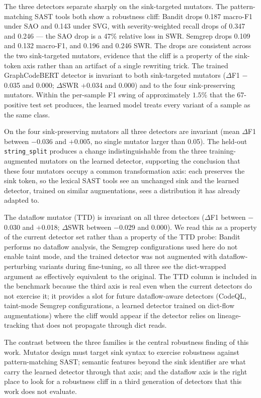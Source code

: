The three detectors separate sharply on the sink-targeted mutators.
The pattern-matching SAST tools both show a robustness cliff: Bandit
drops 0.187 macro-F1 under SAO and 0.143 under SVG, with
severity-weighted recall drops of 0.347 and 0.246 — the SAO drop is
a 47\% relative loss in SWR. Semgrep drops 0.109 and 0.132 macro-F1,
and 0.196 and 0.246 SWR. The drops are consistent across the two
sink-targeted mutators, evidence that the cliff is a property of the
sink-token axis rather than an artifact of a single rewriting trick.
The trained GraphCodeBERT detector is invariant to both sink-targeted
mutators ($\Delta$F1 $-$0.035 and $0.000$; $\Delta$SWR $+$0.034 and
$0.000$) and to the four sink-preserving mutators. Within the
per-sample F1 swing of approximately $1.5\%$ that the 67-positive
test set produces, the learned model treats every variant of a
sample as the same class.

On the four sink-preserving mutators all three detectors are
invariant (mean $\Delta$F1 between $-$0.036 and $+$0.005, no single
mutator larger than 0.05). The held-out \texttt{string\_split}
produces a change indistinguishable from the three training-augmented
mutators on the learned detector, supporting the conclusion that
these four mutators occupy a common transformation axis: each
preserves the sink token, so the lexical SAST tools see an unchanged
sink and the learned detector, trained on similar augmentations,
sees a distribution it has already adapted to.

The dataflow mutator (TTD) is invariant on all three detectors
($\Delta$F1 between $-$0.030 and $+$0.018; $\Delta$SWR between
$-$0.029 and $0.000$). We read this as a property of the current
detector set rather than a property of the TTD probe: Bandit
performs no dataflow analysis, the Semgrep configurations used here
do not enable taint mode, and the trained detector was not
augmented with dataflow-perturbing variants during fine-tuning, so
all three see the dict-wrapped argument as effectively equivalent
to the original. The TTD column is included in the benchmark
because the third axis is real even when the current detectors do
not exercise it; it provides a slot for future dataflow-aware
detectors (CodeQL, taint-mode Semgrep configurations, a learned
detector trained on dict-flow augmentations) where the cliff would
appear if the detector relies on lineage-tracking that does not
propagate through dict reads.

The contrast between the three families is the central robustness
finding of this work. Mutator design must target sink syntax to
exercise robustness against pattern-matching SAST; semantic features
beyond the sink identifier are what carry the learned detector
through that axis; and the dataflow axis is the right place to look
for a robustness cliff in a third generation of detectors that this
work does not evaluate.

